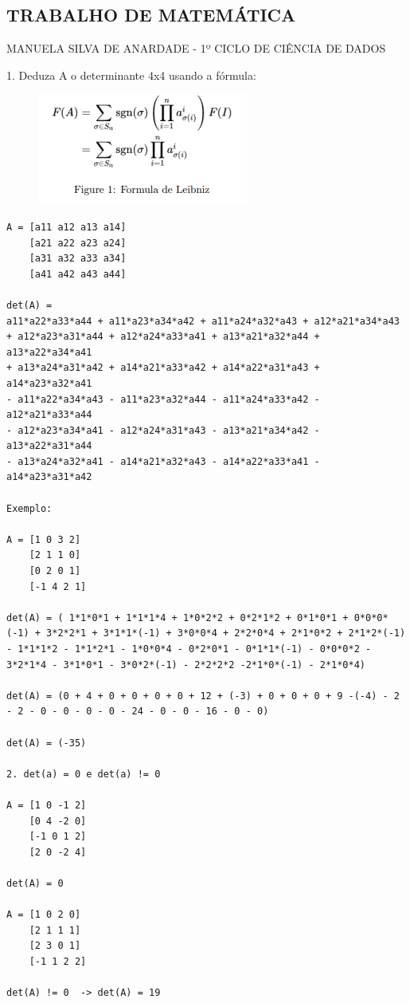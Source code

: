 \documentclass{article}
\begin{document}
\begin{center}

\subsection{TRABALHO DE MATEMÁTICA}

MANUELA SILVA DE ANARDADE - 1º CICLO DE CIÊNCIA DE DADOS

\end{center}


1. Deduza A o determinante 4x4 usando a fórmula:

\begin{figure}[h]
    \centering
    \includegraphics{Captura de tela 2023-05-09 075535.png}
    \label{fig:my_label}
\end{figure}

\begin{lstlisting}    
A = [a11 a12 a13 a14]
    [a21 a22 a23 a24]
    [a31 a32 a33 a34]
    [a41 a42 a43 a44]

det(A) =
a11*a22*a33*a44 + a11*a23*a34*a42 + a11*a24*a32*a43 + a12*a21*a34*a43
+ a12*a23*a31*a44 + a12*a24*a33*a41 + a13*a21*a32*a44 + a13*a22*a34*a41
+ a13*a24*a31*a42 + a14*a21*a33*a42 + a14*a22*a31*a43 + a14*a23*a32*a41
- a11*a22*a34*a43 - a11*a23*a32*a44 - a11*a24*a33*a42 - a12*a21*a33*a44
- a12*a23*a34*a41 - a12*a24*a31*a43 - a13*a21*a34*a42 - a13*a22*a31*a44
- a13*a24*a32*a41 - a14*a21*a32*a43 - a14*a22*a33*a41 - a14*a23*a31*a42

Exemplo:

A = [1 0 3 2]
    [2 1 1 0]
    [0 2 0 1]
    [-1 4 2 1]

det(A) = ( 1*1*0*1 + 1*1*1*4 + 1*0*2*2 + 0*2*1*2 + 0*1*0*1 + 0*0*0*(-1) + 3*2*2*1 + 3*1*1*(-1) + 3*0*0*4 + 2*2*0*4 + 2*1*0*2 + 2*1*2*(-1) - 1*1*1*2 - 1*1*2*1 - 1*0*0*4 - 0*2*0*1 - 0*1*1*(-1) - 0*0*0*2 - 3*2*1*4 - 3*1*0*1 - 3*0*2*(-1) - 2*2*2*2 -2*1*0*(-1) - 2*1*0*4)

det(A) = (0 + 4 + 0 + 0 + 0 + 0 + 12 + (-3) + 0 + 0 + 0 + 9 -(-4) - 2 - 2 - 0 - 0 - 0 - 0 - 24 - 0 - 0 - 16 - 0 - 0)

det(A) = (-35)

2. det(a) = 0 e det(a) != 0

A = [1 0 -1 2]
    [0 4 -2 0]
    [-1 0 1 2]
    [2 0 -2 4]
    
det(A) = 0

A = [1 0 2 0]
    [2 1 1 1]
    [2 3 0 1]
    [-1 1 2 2]
    
det(A) != 0  -> det(A) = 19

\end{lstlisting}
\end{document}
